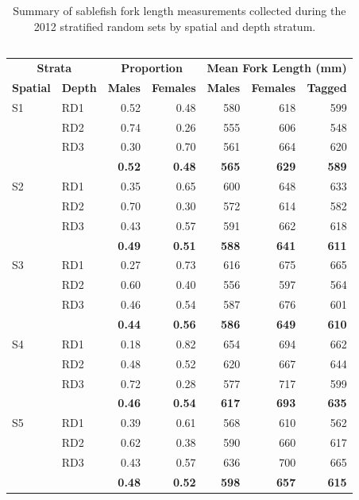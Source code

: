\documentclass[12pt]{article}\usepackage[]{graphicx}\usepackage[]{color}
\begin{document}
\begin{table}[!h]

\caption{\label{tab:table6}Summary of sablefish fork length measurements collected during the 2012 stratified random sets by spatial and depth stratum. ~\\
\hspace*{0.333em}\\}
\fontsize{9.5}{11.5}\selectfont
\begin{tabular}[t]{llrrrrr}
\toprule
\multicolumn{2}{c}{\textbf{Strata}} & \multicolumn{2}{c}{\textbf{Proportion}} & \multicolumn{3}{c}{\textbf{Mean Fork Length (mm)}} \\
\cmidrule(l{3pt}r{3pt}){1-2} \cmidrule(l{3pt}r{3pt}){3-4} \cmidrule(l{3pt}r{3pt}){5-7}
\textbf{Spatial} & \textbf{Depth} & \textbf{Males} & \textbf{Females} & \textbf{Males} & \textbf{Females} & \textbf{Tagged}\\
\midrule
S1 & RD1 & 0.52 & 0.48 & 580 & 618 & 599\\
 & RD2 & 0.74 & 0.26 & 555 & 606 & 548\\
 & RD3 & 0.30 & 0.70 & 561 & 664 & 620\\
\midrule
\textbf{} & \textbf{} & \textbf{0.52} & \textbf{0.48} & \textbf{565} & \textbf{629} & \textbf{589}\\
\midrule
S2 & RD1 & 0.35 & 0.65 & 600 & 648 & 633\\
 & RD2 & 0.70 & 0.30 & 572 & 614 & 582\\
 & RD3 & 0.43 & 0.57 & 591 & 662 & 618\\
\midrule
\textbf{} & \textbf{} & \textbf{0.49} & \textbf{0.51} & \textbf{588} & \textbf{641} & \textbf{611}\\
\midrule
S3 & RD1 & 0.27 & 0.73 & 616 & 675 & 665\\
 & RD2 & 0.60 & 0.40 & 556 & 597 & 564\\
 & RD3 & 0.46 & 0.54 & 587 & 676 & 601\\
\midrule
\textbf{} & \textbf{} & \textbf{0.44} & \textbf{0.56} & \textbf{586} & \textbf{649} & \textbf{610}\\
\midrule
S4 & RD1 & 0.18 & 0.82 & 654 & 694 & 662\\
 & RD2 & 0.48 & 0.52 & 620 & 667 & 644\\
 & RD3 & 0.72 & 0.28 & 577 & 717 & 599\\
\midrule
\textbf{} & \textbf{} & \textbf{0.46} & \textbf{0.54} & \textbf{617} & \textbf{693} & \textbf{635}\\
\midrule
S5 & RD1 & 0.39 & 0.61 & 568 & 610 & 562\\
 & RD2 & 0.62 & 0.38 & 590 & 660 & 617\\
 & RD3 & 0.43 & 0.57 & 636 & 700 & 665\\
\midrule
\textbf{} & \textbf{} & \textbf{0.48} & \textbf{0.52} & \textbf{598} & \textbf{657} & \textbf{615}\\
\bottomrule
\end{tabular}
\end{table}
\clearpage
\end{document}

